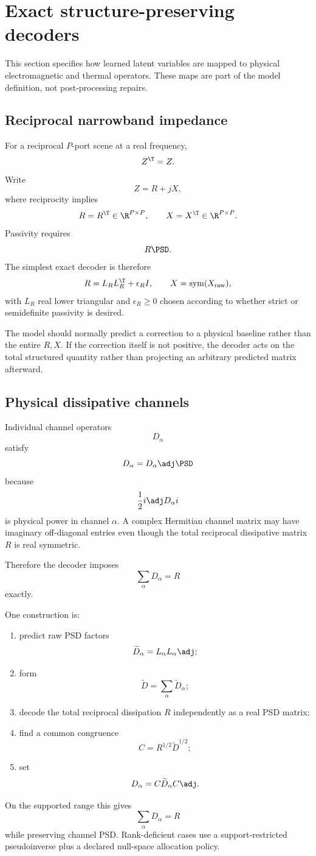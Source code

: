 \section{Exact structure-preserving decoders}
\label{sec:structured-decoders}

This section specifies how learned latent variables are mapped to physical
electromagnetic and thermal operators. These maps are part of the model
definition, not post-processing repairs.

\subsection{Reciprocal narrowband impedance}

For a reciprocal $P$-port scene at a real frequency,
\[
  Z^\T=Z.
\]
Write
\[
  Z=R+jX,
\]
where reciprocity implies
\[
  R=R^\T\in\R^{P\times P},\qquad
  X=X^\T\in\R^{P\times P}.
\]
Passivity requires
\[
  R\PSD.
\]
The simplest exact decoder is therefore
\[
  R=L_RL_R^\T+\epsilon_R I,
  \qquad
  X=\operatorname{sym}(X_{\rm raw}),
\]
with $L_R$ real lower triangular and $\epsilon_R\ge0$ chosen according to
whether strict or semidefinite passivity is desired.

The model should normally predict a correction to a physical baseline rather
than the entire $R,X$. If the correction itself is not positive, the decoder
acts on the total structured quantity rather than projecting an arbitrary
predicted matrix afterward.

\subsection{Physical dissipative channels}

Individual channel operators
\[
 D_\alpha
\]
satisfy
\[
 D_\alpha=D_\alpha\adj\PSD
\]
because
\[
 \frac12 i\adj D_\alpha i
\]
is physical power in channel $\alpha$. A complex Hermitian channel matrix may
have imaginary off-diagonal entries even though the total reciprocal
dissipative matrix $R$ is real symmetric.

Therefore the decoder imposes
\[
  \sum_\alpha D_\alpha=R
  \label{eq:channel-closure}
\]
exactly.

One construction is:
\begin{enumerate}
\item predict raw PSD factors
  \[
    \widetilde D_\alpha=L_\alpha L_\alpha\adj;
  \]
\item form
  \[
    \widetilde D=\sum_\alpha\widetilde D_\alpha;
  \]
\item decode the total reciprocal dissipation $R$ independently as a real PSD
      matrix;
\item find a common congruence
  \[
    C=R^{1/2}\widetilde D^{\dagger/2};
  \]
\item set
  \[
    D_\alpha=C\widetilde D_\alpha C\adj.
  \]
\end{enumerate}
On the supported range this gives
\[
 \sum_\alpha D_\alpha=R
\]
while preserving channel PSD. Rank-deficient cases use a support-restricted
pseudoinverse plus a declared null-space allocation policy.


